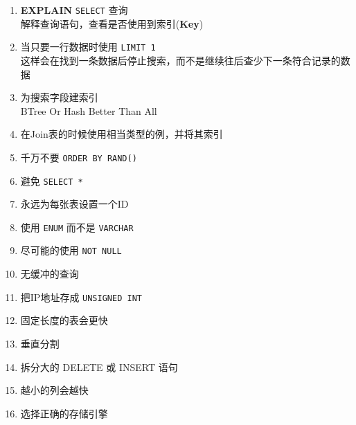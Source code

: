 \documentclass[UTF8,a4paper,12pt]{ctexbook}
\begin{document}
			\begin{enumerate}
				\item \textbf{EXPLAIN} \verb|SELECT| 查询 \\ 解释查询语句，查看是否使用到索引(\textbf{Key})
				\item 当只要一行数据时使用 \verb|LIMIT 1|  \\ 这样会在找到一条数据后停止搜索，而不是继续往后查少下一条符合记录的数据
				\item 为搜索字段建索引 \\ BTree Or Hash Better Than All
				\item 在Join表的时候使用相当类型的例，并将其索引
				\item 千万不要 \verb|ORDER BY RAND()|
				\item 避免 \verb|SELECT *|
				\item 永远为每张表设置一个ID
				\item 使用 \verb|ENUM| 而不是 \verb|VARCHAR|
				\item 尽可能的使用 \verb|NOT NULL|
				\item 无缓冲的查询
				\item 把IP地址存成 \verb|UNSIGNED INT|
				\item 固定长度的表会更快
				\item 垂直分割
				\item 拆分大的 DELETE 或 INSERT 语句
				\item 越小的列会越快
				\item 选择正确的存储引擎
			\end{enumerate}
		
		    
\end{document}
